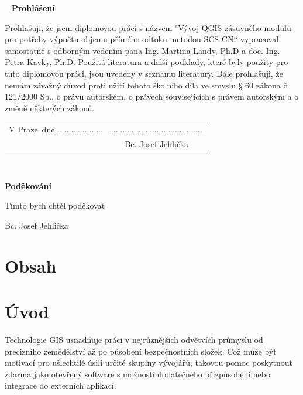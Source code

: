\documentclass[a4paper,oneside,12pt]{book}
\newcommand{\tb}{\textbf} %
\newcommand{\autor}{Bc. Josef Jehlička}   %
\newcommand{\kde}{Praze} %
\newcommand{\prohlaseni}{Prohlašuji, že jsem diplomovou práci s názvem "Vývoj QGIS zásuvného modulu pro potřeby výpočtu objemu přímého odtoku metodou SCS-CN“ vypracoval samostatně s odborným vedením pana Ing. Martina Landy, Ph.D a doc. Ing. Petra Kavky, Ph.D. Použitá literatura a další podklady, které byly použity pro tuto diplomovou práci, jsou uvedeny v seznamu literatury. Dále prohlašuji, že nemám závažný důvod proti užití tohoto školního díla ve smyslu § 60 zákona č. 121/2000 Sb., o právu autorském, o právech souvisejících s právem autorským a o změně některých zákonů.
} %
\newcommand{\podekovani}{Tímto bych chtěl poděkovat } %
\begin{document}
\newpage %
\thispagestyle{empty}  %

~ %
\vfill %
\vspace{1em}
\tb{Prohlášení} %

\vspace{1em} %
\prohlaseni

\vspace{2em}  %
\hspace{-0.5em}\begin{tabularx}{\textwidth}{X c}  %
V \kde\ dne .................... &........................................ \\	%
	& \autor
\end{tabularx}	%







\newpage %
\thispagestyle{empty}  %

~
\vfill %


\vspace{1em}
\tb{Poděkování}

\vspace{1em} %
\podekovani
\begin{flushright}
\autor
\end{flushright}  %





\newpage
\chapter*{Obsah}




\newpage
\chapter*{Úvod} \label{uvod}
Technologie GIS usnadňuje práci v nejrůznějších odvětvích průmyslu od precizního zemědělství až po působení bezpečnostních složek. Což může být motivací pro ušlechtilé úsilí určité skupiny vývojářů, takovou pomoc poskytnout zdarma jako otevřený software s možností dodatečného přizpůsobení nebo integrace do externích aplikací. 
\end{document}
